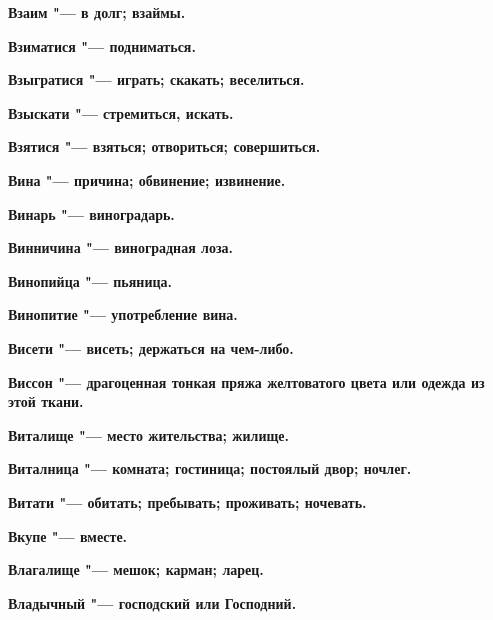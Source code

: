 \begin{mymulticols}{2}
\bfseries Взаим\normalfont{} "--- в долг; взаймы. 




\bfseries Взиматися\normalfont{} "--- подниматься. 




\bfseries Взыгратися\normalfont{} "--- играть; скакать; веселиться. 




\bfseries Взыскати\normalfont{} "--- стремиться, искать. 




\bfseries Взятися\normalfont{} "--- взяться; отвориться; совершиться. 




\bfseries Вина\normalfont{} "--- причина; обвинение; извинение. 




\bfseries Винарь\normalfont{} "--- виноградарь. 




\bfseries Винничина\normalfont{} "--- виноградная лоза. 




\bfseries Винопийца\normalfont{} "--- пьяница. 




\bfseries Винопитие\normalfont{} "--- употребление вина. 




\bfseries Висети\normalfont{} "--- висеть; держаться на чем-либо. 




\bfseries Виссон\normalfont{} "--- драгоценная тонкая пряжа желтоватого цвета или одежда из этой ткани. 




\bfseries Виталище\normalfont{} "--- место жительства; жилище. 




\bfseries Виталница\normalfont{} "--- комната; гостиница; постоялый двор; ночлег. 




\bfseries Витати\normalfont{} "--- обитать; пребывать; проживать; ночевать. 




\bfseries Вкупе\normalfont{} "--- вместе. 




\bfseries Влагалище\normalfont{} "--- мешок; карман; ларец. 




\bfseries Владычный\normalfont{} "--- господский или Господний. 





\end{mymulticols}
